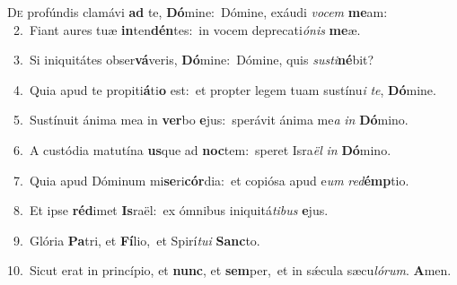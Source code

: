 \lettrine{\initial\textcolor{\initialcolor}{D}}{e} profúndis clamávi \textbf{ad} te, \textbf{Dó}\-mine:~\star Dómine, exáudi \textit{vo}\-\textit{cem} \textbf{me}\-am:\\
{\numbfont\textcolor{\numbcolor}{~2.}}~Fiant aures tuæ \textbf{in}\-ten\-\textbf{dén}\-tes:~\star in vocem deprecati\-\textit{ó}\-\textit{nis} \textbf{me}\-æ.\par
{\numbfont\textcolor{\numbcolor}{~3.}}~Si iniquitátes obser\-\textbf{vá}\-veris, \textbf{Dó}\-mine:~\star Dómine, quis \textit{sus}\-\textit{ti}\textbf{né}bit?\par
{\numbfont\textcolor{\numbcolor}{~4.}}~Quia apud te propiti\-\textbf{á}\-ti\textbf{o} est:~\star et propter legem tuam sustínu\textit{i} \textit{te}\-, \textbf{Dó}\-mine.\par
{\numbfont\textcolor{\numbcolor}{~5.}}~Sustínuit ánima mea in \textbf{ver}\-bo \textbf{e}\-jus:~\star sperávit ánima me\textit{a} \textit{in} \textbf{Dó}\-mino.\par
{\numbfont\textcolor{\numbcolor}{~6.}}~A custódia matutína \textbf{us}\-que ad \textbf{noc}\-tem:~\star speret Isra\textit{ël} \textit{in} \textbf{Dó}\-mino.\par
{\numbfont\textcolor{\numbcolor}{~7.}}~Quia apud Dóminum mi\-\textbf{se}\-ri\-\textbf{cór}\-dia:~\star et copiósa apud e\textit{um} \textit{red}\-\textbf{émp}tio.\par
{\numbfont\textcolor{\numbcolor}{~8.}}~Et ipse \textbf{réd}\-imet \textbf{Is}\-raël:~\star ex ómnibus iniquitá\-\textit{ti}\-\textit{bus} \textbf{e}\-jus.\par
{\numbfont\textcolor{\numbcolor}{~9.}}~Glória \textbf{Pa}\-tri, et \textbf{Fí}\-lio,~\star et Spirí\-\textit{tu}\-\textit{i} \textbf{Sanc}\-to.\par
{\numbfont\textcolor{\numbcolor}{10.}}~Sicut erat in princípio, et \textbf{nunc}\-, et \textbf{sem}\-per,~\star et in sǽcula sæcu\-\textit{ló}\-\textit{rum}. \textbf{A}\-men.\par
